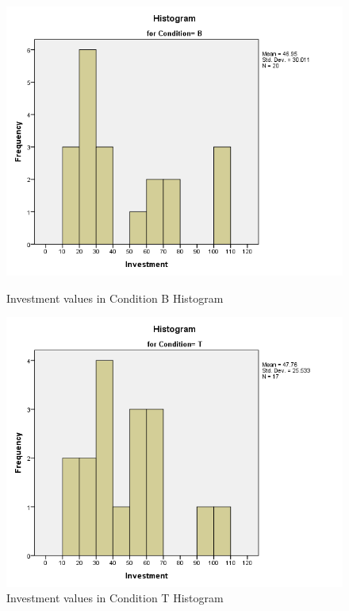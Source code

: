 \begin{figure}[h]
    \centering
    \begin{minipage}[b]{.45\textwidth}
        \centering
        \includegraphics[width=\textwidth]{graphs/InvestmentHisto1.png}
        \caption{Investment values in Condition B Histogram}
        \label{fig:InvestmentConditionBHistogram}
    \end{minipage}
    \hfill
    \begin{minipage}[b]{.45\textwidth}
        \centering
        \includegraphics[width=\textwidth]{graphs/InvestmentHisto2.png}
        \caption{Investment values in Condition T Histogram}
        \label{fig:InvestmentConditionTHistogram}
    \end{minipage}
\end{figure}



